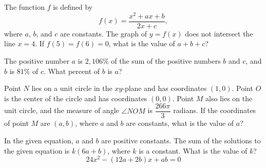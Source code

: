 \noindent\markforreview
\vspace{1em}

The function \(f\) is defined by
\[
f(x) = \dfrac{x^{2} + ax + b}{2x + c},
\]
where \(a\), \(b\), and \(c\) are constants. The graph of \(y = f(x)\) does not intersect the line \(x = 4\). If \(f(5) = f(6) = 0\), what is the value of \(a + b + c\)?

\vspace{0.75em}


\vspace{2em}
\newpage

\noindent\markforreview
\vspace{1em}

The positive number \(a\) is \(2{,}106\%\) of the sum of the positive numbers \(b\) and \(c\), and \(b\) is \(81\%\) of \(c\).
What percent of \(b\) is \(a\)?

\vspace{0.75em}


\vspace{2em}
\newpage

\noindent\markforreview
\vspace{1em}

Point \(N\) lies on a unit circle in the \(xy\)-plane and has coordinates \((1, 0)\). Point \(O\) is the center of the circle and has coordinates \((0, 0)\). Point \(M\) also lies on the unit circle, and the measure of angle \(\angle NOM\) is \(\dfrac{266\pi}{3}\) radians. If the coordinates of point \(M\) are \((a, b)\), where \(a\) and \(b\) are constants, what is the value of \(a\)?

\vspace{0.75em}


\vspace{2em}
\newpage

\noindent\markforreview
\vspace{1em}

In the given equation, \(a\) and \(b\) are positive constants. The sum of the solutions to the given equation is \(k(6a + b)\), where \(k\) is a constant. What is the value of \(k\)?
\[
24x^{2} - (12a + 2b)x + ab = 0
\]

